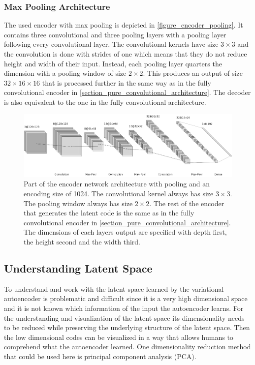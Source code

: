 \subsubsection{Max Pooling Architecture}

The used encoder with max pooling is depicted in \autoref{figure_encoder_pooling}. It contains three
convolutional and three pooling layers with a pooling layer following every convolutional layer. The convolutional
kernels have size $3\times3$ and the convolution is done with strides of one which means that they do not reduce
height and width of their input. Instead, each pooling layer quarters the dimension with a pooling window of size
$2\times 2$. This produces an output of size $32\times16\times16$ that is processed further in the same way
as in the fully convolutional encoder in \autoref{section_pure_convolutional_architecture}.
The decoder is also equivalent to the one in the fully convolutional architecture.

\begin{figure}[H]
    \centering
    \includegraphics[width=\textwidth]{images/figures/encoder_pooling.png}
    \caption{Part of the encoder network architecture with pooling and an encoding size of 1024.
    The convolutional kernel always has size $3\times 3$. The pooling window always has size $2\times 2$.
    The rest of the encoder that generates the latent code is the same as in the fully convolutional encoder
    in \autoref{section_pure_convolutional_architecture}. The dimensions of each layers output are specified with
    depth first, the height second and the width third.} \label{figure_encoder_pooling}
\end{figure}

\subsection{Understanding Latent Space} \label{section_understanding_latent_space}

To understand and work with the latent space learned by the variational autoencoder is problematic and
difficult since it is a very high dimensional space and it is not known which information of the input the
autoencoder learns. For the understanding and visualization of the latent space its dimensionality needs
to be reduced while preserving the underlying structure of the latent space. Then the low dimensional
codes can be visualized in a way that allows humans to comprehend what the autoencoder learned.
One dimensionality reduction method that could be used here is principal component analysis (PCA).

